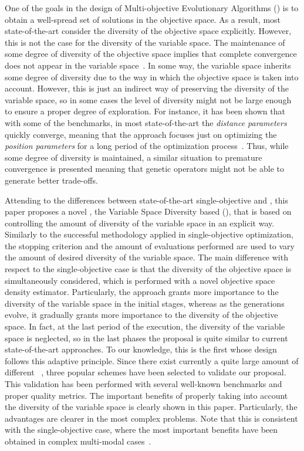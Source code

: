 One of the goals in the design of Multi-objective Evolutionary Algorithms (\MOEAS{}) is to obtain a well-spread 
set of solutions in the objective space.
%
As a result, most state-of-the-art \MOEAS{} consider the diversity of the objective space explicitly.
%
However, this is not the case for the diversity of the variable space.
%
The maintenance of some degree of diversity of the objective space implies that complete convergence 
does not appear in the variable space~\cite{Joel:GDE3_CEC09}.
%
In some way, the variable space inherits some degree of diversity due to the way in which the objective space is 
taken into account. 
%
However, this is just an indirect way of preserving the diversity of the variable space, so 
in some cases the level of diversity might not be large enough to ensure a proper degree of exploration.
%
For instance, it has been shown that with some of the \WFG{} benchmarks, in most state-of-the-art \MOEAS{} 
the \textit{distance parameters} quickly converge, meaning that the approach focuses just on optimizing the 
\textit{position parameters} for a long period of the optimization process~\cite{Joel:GDE3_CEC09}.
%
Thus, while some degree of diversity is maintained, a similar situation to premature convergence is presented
meaning that genetic operators might not be able to generate better trade-offs. 

Attending to the differences between state-of-the-art single-objective \EAS{} and \MOEAS{}, 
this paper proposes a novel \MOEA{}, the Variable Space Diversity based \MOEA{} (\VSDMOEA{}), 
that is based on controlling the amount of diversity of the variable space in an explicit way.
%
Similarly to the successful methodology applied in single-objective optimization, the stopping criterion and the 
amount of evaluations performed are used to vary the amount of desired diversity of the variable space.
%
The main difference with respect to the single-objective case is that the diversity of the objective space is simultaneously considered, 
which is performed with a novel objective space density estimator.
%
Particularly, the approach grants more importance to the diversity of the variable space in the initial stages, whereas 
as the generations evolve, it gradually grants more importance to the diversity of the objective space.
%
In fact, at the last period of the execution, the diversity of the variable space is neglected, so in the last phases the proposal 
is quite similar to current state-of-the-art approaches.
%
To our knowledge, this is the first \MOEA{} whose design follows this adaptive principle.
%
Since there exist currently a quite large amount of different \MOEAS{}~\cite{Joel:MOEA_APPLICATIONS_BOOK_KCTAN}, 
three popular schemes have been selected to validate our proposal.
%
This validation has been performed with several well-known benchmarks and proper quality metrics.
%
The important benefits of properly taking into account the diversity of the variable space is
clearly shown in this paper.
%
Particularly, the advantages are clearer in the most complex problems.
%
Note that this is consistent with the single-objective case, where the most important benefits have been obtained
in complex multi-modal cases~\cite{Segura:17}.


